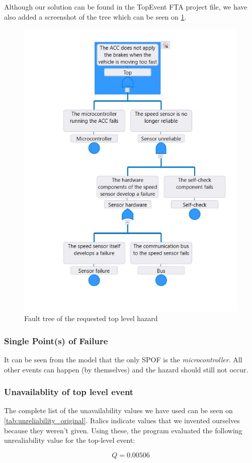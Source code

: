\documentclass[a4paper]{article}
\begin{document}
Although our solution can be found in the TopEvent FTA project file, we have
also added a screenshot of the tree which can be seen on
\cref{fig:fault_tree_original}.

\begin{figure}
	\centering
	\includegraphics[width=.5\textwidth]{fault_tree_original.jpg}
	\caption{Fault tree of the requested top level hazard}%
	\label{fig:fault_tree_original}
\end{figure}

\subsubsection{Single Point(s) of Failure}

It can be seen from the model that the only \gls{SPOF} is the
\emph{microcontroller}. All other events can happen (by themselves) and the
hazard should still not occur.

\pagebreak
\subsubsection{Unavailablity of top level event}

The complete list of the unavailability values we have used can be seen on
\cref{tab:unreliability_original}. Italics indicate values that we invented
ourselves because they weren't given. Using these, the program evaluated the
following unrealiability value for the top-level event:

\[ Q = 0.00506 \]
\end{document}
